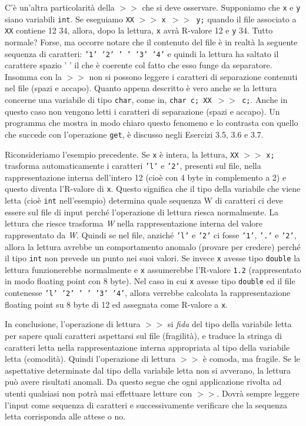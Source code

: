 \documentclass[a4paper,12pt]{book}
\begin{document}
\begin{itemize}
\noindent C'è un'altra particolarità della $>>$ che si deve osservare.
Supponiamo che \texttt{x} e \texttt{y} siano variabili \texttt{int}.
Se eseguiamo \texttt{XX} $>>$ \texttt{x $>>$ y;} quando il file associato a \texttt{XX} contiene 12 34, allora, dopo la lettura, \texttt{x} avrà R-valore 12 e \texttt{y} 34.
Tutto normale? Forse, ma occorre notare che il contenuto del file è in realtà la seguente sequenza di caratteri: \texttt{'1' '2' ' ' '3' '4'} e quindi la lettura ha saltato il carattere spazio ' ' il che è coerente col fatto che esso funge da separatore.
Insomma con la $>>$ non si possono leggere i caratteri di separazione contenuti nel file (spazi e accapo).
Quanto appena descritto è vero anche se la lettura concerne una variabile di tipo \texttt{char}, come in, \texttt{char c; XX $>>$ c;}.
Anche in questo caso non vengono letti i caratteri di separazione (spazi e accapo).
Un programma che mostra in modo chiaro questo fenomeno e lo contrasta con quello che succede con l'operazione \texttt{get}, è discusso negli Esercizi 3.5, 3.6 e 3.7.

\noindent Riconsideriamo l'esempio precedente.
Se \texttt{x} è intera, la lettura, \texttt{XX} $>>$ \texttt{x;} trasforma automaticamente i caratteri \texttt{'l'} e \texttt{'2'}, presenti sul file, nella rappresentazione interna dell'intero 12 (cioè con 4 byte in complemento a 2) e questo diventa l'R-valore di \texttt{x}.
Questo significa che il tipo della variabile che viene letta (cioè \texttt{int} nell'esempio) determina quale sequenza W di caratteri ci deve essere sul file di input perché l'operazione di lettura riesca normalmente.
La lettura che riesce trasforma \textit{W} nella rappresentazione interna del valore rappresentato da \textit{W}.
Quindi se nel file, anziché \texttt{'l'} e \texttt{'2'} ci fosse \texttt{'1'}, \texttt{'.'} e \texttt{'2'}, allora la lettura avrebbe un comportamento anomalo (provare per credere) perché il tipo \texttt{int} non prevede un punto nei suoi valori.
Se invece \texttt{x} avesse tipo \texttt{double} la lettura funzionerebbe normalmente e \texttt{x} assumerebbe l'R-valore \texttt{1.2} (rappresentato in modo floating point con 8 byte).
Nel caso in cui \texttt{x} avesse tipo \texttt{double} ed il file contenesse \texttt{'l' '2' ' ' '3' '4'}, allora verrebbe calcolata la rappresentazione floating point su 8 byte di 12 ed assegnata come R-valore a \texttt{x}.

\noindent In conclusione, l'operazione di lettura $>>$ si \textit{fida} del tipo della variabile letta per sapere quali caratteri aspettarsi sul file (fragilità), e traduce la stringa di caratteri letta nella rappresentazione interna appropriata al tipo della variabile letta (comodità).
Quindi l'operazione di lettura $>>$ è comoda, ma fragile.
Se le aspettative determinate dal tipo della variabile letta non si avverano, la lettura può avere risultati anomali.
Da questo segue che ogni applicazione rivolta ad utenti qualsiasi non potrà mai effettuare letture con $>>$.
Dovrà sempre leggere l'input come sequenza di caratteri e successivamente verificare che la sequenza letta corrisponda alle attese o no.


\end{itemize}
\end{document}
